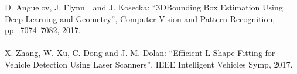 \begin{mythebibliography}{}
%
%
%
%

%



\newpage
\subsection*{}

\leavevmode \\ D. Anguelov, J. Flynn　and J. Kosecka:
\newblock ``3DBounding Box Estimation Using Deep Learning and Geometry'',
\newblock  Computer Vision and Pattern Recognition, pp.~7074--7082, 2017.
\\
            
\leavevmode \\ X. Zhang, W. Xu, C. Dong and J. M. Dolan:
\newblock ``Efficient L-Shape Fitting for Vehicle Detection Using Laser Scanners'',
\newblock IEEE Intelligent Vehicles Symp, 2017.
\\


\end{mythebibliography}

